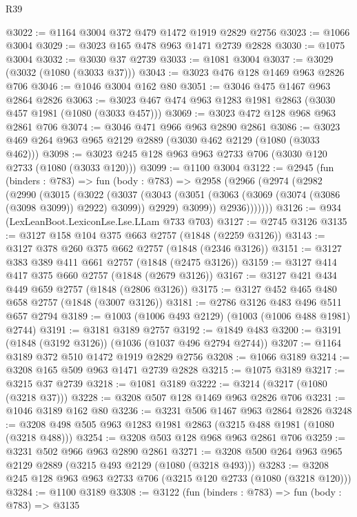 \begin{lexlean}{R39}
\begin{coremodule}
@3022 := @1164 @3004 @372 @479 @1472 @1919 @2829 @2756
@3023 := @1066 @3004
@3029 := @3023 @165 @478 @963 @1471 @2739 @2828
@3030 := @1075 @3004
@3032 := @3030 @37 @2739
@3033 := @1081 @3004
@3037 := @3029 (@3032 (@1080 (@3033 @37)))
@3043 := @3023 @476 @128 @1469 @963 @2826 @706
@3046 := @1046 @3004 @162 @80
@3051 := @3046 @475 @1467 @963 @2864 @2826
@3063 := @3023 @467 @474 @963 @1283 @1981 @2863 (@3030 @457 @1981 (@1080 (@3033 @457)))
@3069 := @3023 @472 @128 @968 @963 @2861 @706
@3074 := @3046 @471 @966 @963 @2890 @2861
@3086 := @3023 @469 @264 @963 @965 @2129 @2889 (@3030 @462 @2129 (@1080 (@3033 @462)))
@3098 := @3023 @245 @128 @963 @963 @2733 @706 (@3030 @120 @2733 (@1080 (@3033 @120)))
@3099 := @1100 @3004
@3122 := @2945
    (fun (binders : @783) =>
    fun (body : @783) =>
    @2958
      (@2966
        (@2974
          (@2982
            (@2990
              (@3015
                (@3022
                  (@3037
                    (@3043
                      (@3051 (@3063 (@3069 (@3074 (@3086 (@3098 @3099)) @2922) @3099)) @2929)
                      @3099))
                  @2936)))))))
@3126 := @934 (LexLeanBoot.LexiconLse.Lse.LLam @733 @703)
@3127 := @2745 @3126
@3135 := @3127 @158 @104 @375 @663 @2757 (@1848 (@2259 @3126))
@3143 := @3127 @378 @260 @375 @662 @2757 (@1848 (@2346 @3126))
@3151 := @3127 @383 @389 @411 @661 @2757 (@1848 (@2475 @3126))
@3159 := @3127 @414 @417 @375 @660 @2757 (@1848 (@2679 @3126))
@3167 := @3127 @421 @434 @449 @659 @2757 (@1848 (@2806 @3126))
@3175 := @3127 @452 @465 @480 @658 @2757 (@1848 (@3007 @3126))
@3181 := @2786 @3126 @483 @496 @511 @657 @2794
@3189 := @1003 (@1006 @493 @2129) (@1003 (@1006 @488 @1981) @2744)
@3191 := @3181 @3189 @2757
@3192 := @1849 @483
@3200 := @3191 (@1848 (@3192 @3126)) (@1036 (@1037 @496 @2794 @2744))
@3207 := @1164 @3189 @372 @510 @1472 @1919 @2829 @2756
@3208 := @1066 @3189
@3214 := @3208 @165 @509 @963 @1471 @2739 @2828
@3215 := @1075 @3189
@3217 := @3215 @37 @2739
@3218 := @1081 @3189
@3222 := @3214 (@3217 (@1080 (@3218 @37)))
@3228 := @3208 @507 @128 @1469 @963 @2826 @706
@3231 := @1046 @3189 @162 @80
@3236 := @3231 @506 @1467 @963 @2864 @2826
@3248 := @3208 @498 @505 @963 @1283 @1981 @2863 (@3215 @488 @1981 (@1080 (@3218 @488)))
@3254 := @3208 @503 @128 @968 @963 @2861 @706
@3259 := @3231 @502 @966 @963 @2890 @2861
@3271 := @3208 @500 @264 @963 @965 @2129 @2889 (@3215 @493 @2129 (@1080 (@3218 @493)))
@3283 := @3208 @245 @128 @963 @963 @2733 @706 (@3215 @120 @2733 (@1080 (@3218 @120)))
@3284 := @1100 @3189
@3308 := @3122
    (fun (binders : @783) =>
    fun (body : @783) =>
    @3135

\end{coremodule}
\end{lexlean}
